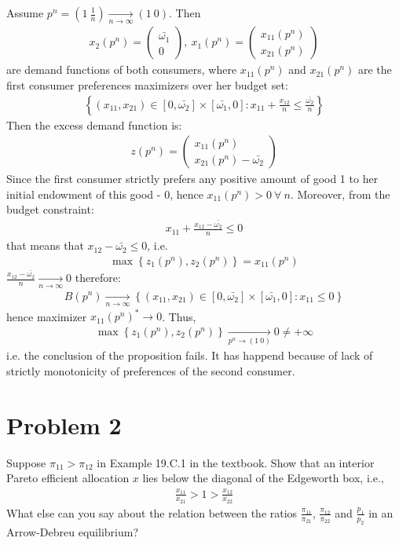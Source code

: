 \documentclass[a4paper]{article}
\begin{document}
Assume $p^n = \left(1\ \frac{1}{n}\right) \underset{n \to \infty}{\to} (1\ 0)$. Then 
\begin{align*}
x_2(p^n) = \begin{pmatrix}
\bar{\omega_1}\\
0
\end{pmatrix},\ x_1(p^n) = \begin{pmatrix}
x_{11}(p^n)\\
x_{21}(p^n)
\end{pmatrix}
\end{align*}
are demand functions of both consumers, where $x_{11}(p^n)$ and $x_{21}(p^n)$ are the first consumer preferences maximizers over her budget set:
\begin{align*}
\left\{(x_{11}, x_{21}) \in [0, \bar{\omega_2}] \times [\bar{\omega_1}, 0]: x_{11} + \frac{x_{12}}{n} \le \frac{\bar{\omega_2}}{n} \right\}
\end{align*}
Then the excess demand function is:
\begin{align*}
z(p^n) = \begin{pmatrix}
x_{11}(p^n)\\
x_{21}(p^n) - \bar{\omega_2}
\end{pmatrix}
\end{align*}
Since the first consumer strictly prefers any positive amount of good 1 to her initial endowment of this good - 0, hence $x_{11}(p^n) > 0\ \forall\ n$. Moreover, from the budget constraint:
\begin{align*}
x_{11} + \frac{x_{12} - \bar{\omega_2}}{n} \le 0
\end{align*}
that means that $x_{12} - \bar{\omega_2} \le 0$, i.e.
\begin{align*}
\max \left\{z_1(p^n), z_2(p^n) \right\} = x_{11}(p^n)
\end{align*}
$\frac{x_{12} - \bar{\omega_2}}{n} \underset{n \to \infty}{\to} 0$ therefore:
\begin{align*}
B(p^n) \underset{n \to \infty}{\to} \left\{(x_{11}, x_{21}) \in [0, \bar{\omega_2}] \times [\bar{\omega_1}, 0]: x_{11} \le 0 \right\}
\end{align*}
hence maximizer $x_{11}(p^n)^* \to 0$.
Thus, 
\begin{align*}
\max\left\{z_1(p^n), z_2(p^n)\right\} \underset{p^n \to (1\ 0)}{\to} 0 \neq +\infty
\end{align*}
i.e. the conclusion of the proposition fails. It has happend because of lack of strictly monotonicity of preferences of the second consumer.
\section*{Problem 2}
Suppose $\pi_{11} > \pi_{12}$ in Example 19.C.1 in the textbook. Show that an interior Pareto
efficient allocation $x$ lies below the diagonal of the Edgeworth box, i.e., 
\begin{align*}
\frac{x_{11}}{x_{21}} > 1 > \frac{x_{12}}{x_{22}}
\end{align*}
What
else can you say about the relation between the ratios $\frac{\pi_{11}}{\pi_{21}}$, $\frac{\pi_{12}}{\pi_{22}}$ and $\frac{p_1}{p_2}$ in an
Arrow-Debreu equilibrium?
\end{document}
